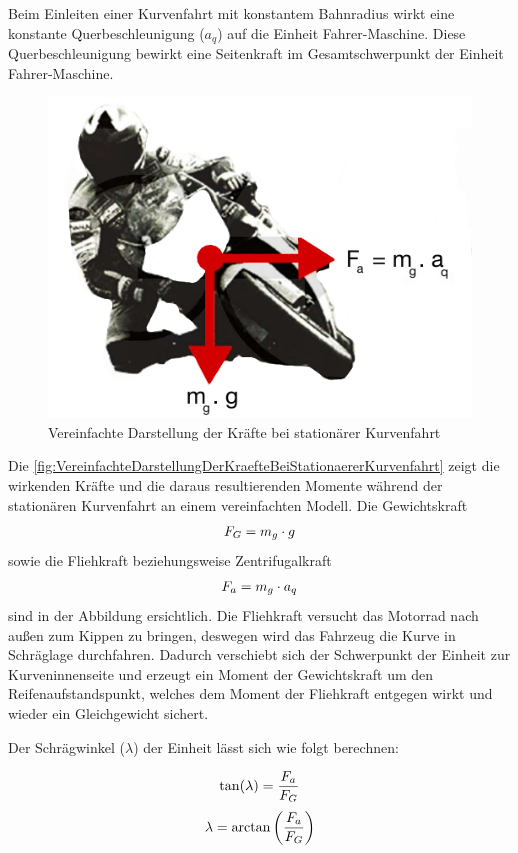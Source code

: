 Beim Einleiten einer Kurvenfahrt mit konstantem Bahnradius wirkt eine konstante Querbeschleunigung ($a_q$) auf die Einheit \glqq Fahrer-Maschine\grqq{}. Diese Querbeschleunigung bewirkt eine Seitenkraft im Gesamtschwerpunkt der Einheit \glqq Fahrer-Maschine\grqq{}. %
\begin{figure}[htpb]
	\centering
	\includegraphics[width=0.4\linewidth]{Bilder/VereinfachteDarstellungDerKraefteBeiStationaererKurvenfahrt2_pdf.pdf}
	\caption{Vereinfachte Darstellung der Kräfte bei stationärer Kurvenfahrt \citep{Haedrich2012}}
	\label{fig:VereinfachteDarstellungDerKraefteBeiStationaererKurvenfahrt}
\end{figure}
Die \autoref{fig:VereinfachteDarstellungDerKraefteBeiStationaererKurvenfahrt} zeigt die wirkenden Kräfte und die daraus resultierenden Momente während der stationären Kurvenfahrt an einem vereinfachten Modell. Die Gewichtskraft 
\begin{align*}
	\centering
	F_G = m_g \cdot g
\end{align*}
sowie die Fliehkraft beziehungsweise Zentrifugalkraft 
\begin{align*}
	\centering
	F_a = m_g \cdot a_q
\end{align*}
sind in der Abbildung ersichtlich. Die Fliehkraft versucht das Motorrad nach außen zum Kippen zu bringen, deswegen wird das Fahrzeug die Kurve in Schräglage durchfahren. Dadurch verschiebt sich der Schwerpunkt der Einheit zur Kurveninnenseite und erzeugt ein Moment der Gewichtskraft um den Reifenaufstandspunkt, welches dem Moment der Fliehkraft entgegen wirkt und wieder ein Gleichgewicht sichert.

Der Schrägwinkel ($\lambda$) der Einheit lässt sich wie folgt berechnen:


\begin{align*}
	\centering
	\tan(\lambda)  =  \frac{F_a}{F_G}
\end{align*}
\begin{align}
	\centering
	\lambda  =  \arctan \left(\frac{F_a}{F_G}\right)
	\label{gl:Schraegwinkel}
\end{align}





